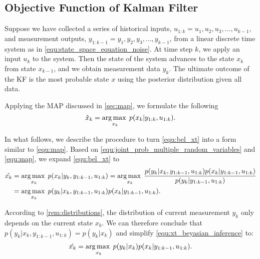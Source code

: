 \subsection{Objective Function of Kalman Filter}

Suppose we have collected a series of historical inputs, $u_{1:k}=u_1,u_2,u_3,\ldots,u_{k-1}$, and measurement outputs, $y_{1:k-1}=y_1,y_2,y_3,\ldots,y_{k-1}$, from a linear discrete time system as in \cref{equ:state_space_equation_noise}.
At time step $k$, we apply an input $u_k$ to the system. 
Then the state of the system advances to the state $x_k$ from state $x_{k-1}$, and we obtain measurement data $y_k$. 
The ultimate outcome of the KF is the most probable state $x$ using the posterior distribution given all data.

Applying the MAP discussed in \cref{sec:map}, we formulate the following
\begin{equation} \label{equ:bel_xt}
	\hat{x}_k = \operatorname*{arg\,max\;}_{x_k} p(x_k|y_{1:k},u_{1:k}).
\end{equation}

In what follows, we describe the procedure to turn \cref{equ:bel_xt} into a form similar to \cref{equ:map}.
Based on \cref{equ:joint_prob_multiple_random_variables} and \cref{equ:map}, we expand \cref{equ:bel_xt} to
\begin{equation} \label{equ:xt_beyasian_inference}
	\begin{split} 
		\hat{x_k} &= \operatorname*{arg\,max\;}_{x_k} p(x_k|y_k, y_{1:k-1},u_{1:k}) 
		 =\operatorname*{arg\,max\;}_{x_k} \frac{p(y_k|x_k,y_{1:k-1},u_{1:k})p(x_k|y_{1:k-1},u_{1:k})}{p(y_k|y_{1:k-1},u_{1:k})}\\
		&=\operatorname*{arg\,max\;}_{x_k} p(y_k|x_k,y_{1:k-1},u_{1:k})p(x_k|y_{1:k-1},u_{1:k}).
	\end{split}
\end{equation}

According to \cref{rem:distributions}, the distribution of current measurement $y_k$ only depends on the current state $x_k$.
We can therefore conclude that
$p(y_k|x_k,y_{1:k-1},u_{1:k}) = p(y_k|x_k)$
and simplify \cref{equ:xt_beyasian_inference} to:
\begin{equation} \label{equ:map_states}
	\hat{x_k} = \operatorname*{arg\,max\;}_{x_k} p(y_k|x_k)p(x_k|y_{1:k-1},u_{1:k}).
\end{equation}

